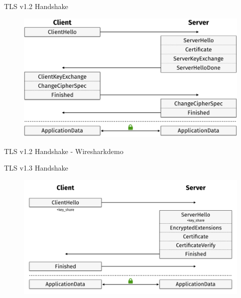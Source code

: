 \documentclass{f4_beamer_metropolis}
\begin{document}
\begin{frame}{TLS v1.2 Handshake}
  \begin{figure}[!h]
    \centering
    \includegraphics[scale=0.375,keepaspectratio]{./images/tls12-handshake-ecdhe.png}
    \label{fig:tls12-handshake-ecdhe}
  \end{figure}

\end{frame}

\begin{frame}[standout]
  TLS v1.2 Handshake - Wiresharkdemo
\end{frame}

\begin{frame}{TLS v1.3 Handshake}
  \begin{figure}[!h]
    \centering
    \vspace*{-0.25cm}
    \includegraphics[width=\linewidth]{./images/tls13-handshake-ecdhe.png}
    \label{fig:tls13-handshake-ecdhe}
  \end{figure}
\end{frame}
\end{document}
